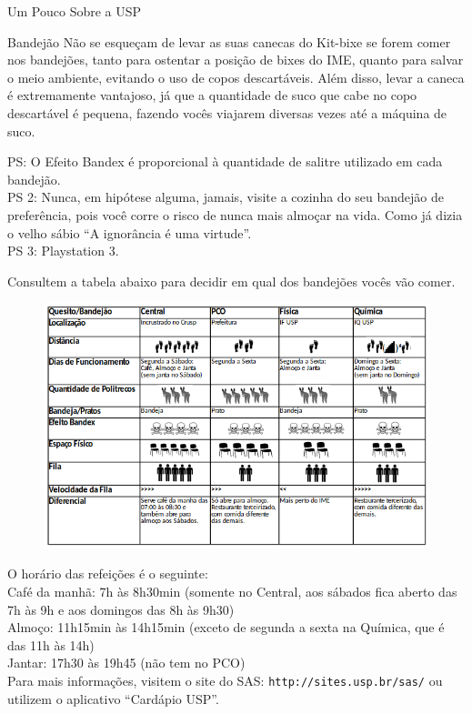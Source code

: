 \begin{secao}{Um Pouco Sobre a USP}
\begin{subsecao}{Bandejão}
Não se esqueçam de levar as suas canecas do Kit-bixe se forem comer nos
bandejões, tanto para ostentar a posição de bixes do IME, quanto para salvar o
meio ambiente, evitando o uso de copos descartáveis. Além disso, levar a caneca
é extremamente vantajoso, já que a quantidade de suco que cabe no copo
descartável é pequena, fazendo vocês viajarem diversas vezes até a máquina de
suco.

PS: O Efeito Bandex é proporcional à quantidade de salitre utilizado em cada
bandejão.\\
PS 2: Nunca, em hipótese alguma, jamais, visite a cozinha do seu bandejão de
preferência, pois você corre o risco de nunca mais almoçar na vida. Como já
dizia o velho sábio ``A ignorância é uma virtude''.\\
PS 3: Playstation 3.

Consultem a tabela abaixo para decidir em qual dos bandejões vocês vão comer.

\begin{figure}[!htbp]
\begin{center}
	\includegraphics{img/src/bandex.png}
\end{center}
\end{figure}
O horário das refeições é o seguinte:\\
Café da manhã: 7h às 8h30min (somente no Central, aos sábados fica aberto das
7h às 9h e aos domingos das 8h às 9h30)\\
Almoço: 11h15min às 14h15min (exceto de segunda a sexta na Química, que é das 11h às 14h)\\
Jantar: 17h30 às 19h45 (não tem no PCO)\\

Para mais informações, visitem o site do SAS: {\tt http://sites.usp.br/sas/} ou
utilizem o aplicativo ``Cardápio USP''.


\end{subsecao}
\end{secao}
